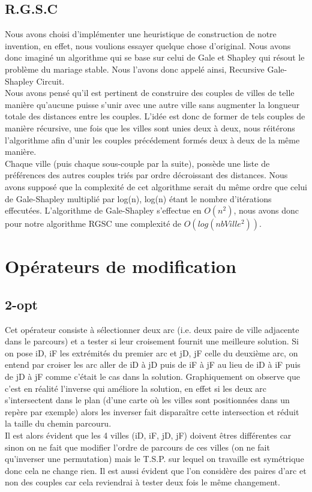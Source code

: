 \documentclass[12pt,a4paper]{article}
\begin{document}
\subsection{R.G.S.C}
Nous avons choisi d'implémenter une heuristique de construction de notre invention, en effet, nous voulions essayer quelque chose d'original. Nous avons donc imaginé un algorithme qui se base sur celui de Gale et Shapley qui résout le problème du mariage stable. Nous l'avons donc appelé ainsi, Recursive Gale-Shapley Circuit.\\
Nous avons pensé qu'il est pertinent de construire des couples de villes de telle manière qu'aucune puisse s'unir avec une autre ville sans augmenter la longueur totale des distances entre les couples. L'idée est donc de former de tels couples de manière récursive, une fois que les villes sont unies deux à deux, nous réitérons l'algorithme afin d'unir les couples précédement formés deux à deux de la même manière.\\
Chaque ville (puis chaque sous-couple par la suite), possède une liste de préférences des autres couples triés par ordre décroissant des distances. Nous avons supposé que la complexité de cet algorithme serait du même ordre que celui de Gale-Shapley multiplié par log(n), log(n) étant le nombre d'itérations effecutées. L'algorithme de Gale-Shapley s'effectue en $O(n^2)$, nous avons donc pour notre algorithme RGSC une complexité de $O(log(nbVille^2))$.\\

\section{Opérateurs de modification}
\subsection{2-opt}
Cet opérateur consiste à sélectionner deux arc (i.e. deux paire de ville adjacente dans le parcours) et a tester si leur croisement fournit une meilleure solution. Si on pose iD, iF les extrémités du premier arc et jD, jF celle du deuxième arc, on entend par croiser les arc aller de iD à jD puis de iF à jF au lieu de iD à iF puis de jD à jF comme c’était le cas dans la solution. Graphiquement on observe que c'est en réalité l'inverse qui améliore la solution, en effet si les deux arc s’intersectent dans le plan (d'une carte où les villes sont positionnées dans un repère par exemple) alors les inverser fait disparaître cette intersection et réduit la taille du chemin parcouru.\\
Il est alors évident que les 4 villes (iD, iF, jD, jF) doivent êtres différentes car sinon on ne fait que modifier l'ordre de parcours de ces villes (on ne fait qu'inverser une permutation) mais le T.S.P. sur lequel on travaille est symétrique donc cela ne change rien. Il est aussi évident que l'on considère des paires d'arc et non des couples car cela reviendrai à tester deux fois le même changement.\\
\end{document}
